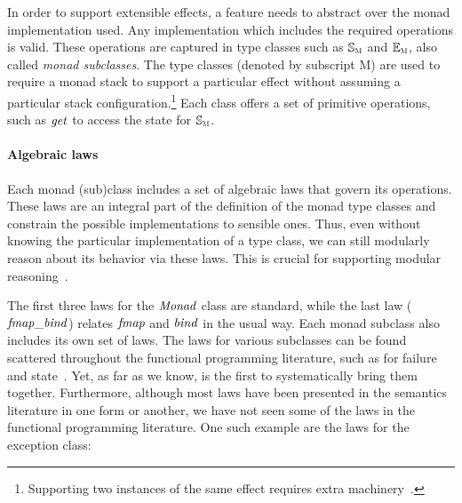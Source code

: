 In order to support extensible effects, a feature needs to abstract
over the monad implementation used. Any implementation which includes
the required operations is valid. These operations are captured in
type classes such as \ensuremath{\mathbb{S}_{\scalebox{0.6}{M}}} and \ensuremath{\mathbb{E}_{\scalebox{0.6}{M}}}, also called
\emph{monad subclasses}.  The type classes (denoted by subscript M)
are used to require a monad stack to support a
particular effect without assuming a particular stack
configuration.\footnote{Supporting two instances of the same effect
requires extra machinery~\cite{zipper}.} Each class offers a set of
primitive operations, such as \ensuremath{\Varid{get}} to access the state for
\ensuremath{\mathbb{S}_{\scalebox{0.6}{M}}}.

\paragraph{Algebraic laws} Each monad (sub)class includes a set of
algebraic laws that govern its operations.  These laws are an integral
part of the definition of the monad type classes and constrain the
possible implementations to sensible ones. Thus, even without knowing
the particular implementation of a type class, we can still modularly
reason about its behavior via these laws. This is crucial for
supporting modular reasoning~\cite{effectiveadvice}.

The first three laws for the \ensuremath{\Conid{Monad}} class are standard, while the
last law (\ensuremath{\Varid{fmap\char95 bind}}) relates \ensuremath{\Varid{fmap}} and \ensuremath{\Varid{bind}} in the usual way.
Each monad subclass also includes its own set of laws. The laws for
various subclasses can be found scattered throughout the functional
programming literature, such as for failure~\cite{gibbons11just} and
state~\cite{effectiveadvice,gibbons11just}. Yet, as far as we know,
\name is the first to systematically bring them together. Furthermore, although most
laws have been presented in the semantics literature in one form or another, we have not
seen some of the laws in the functional programming literature.
One such example are the laws for the exception class:

